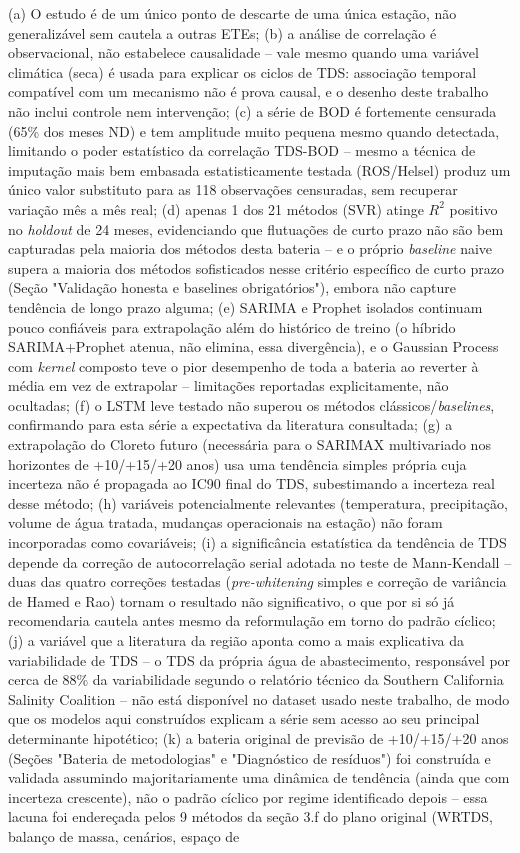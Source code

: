 (a) O estudo é de um único ponto de descarte de uma única estação, não generalizável sem cautela a outras ETEs; (b) a análise de correlação é observacional, não estabelece causalidade -- vale mesmo quando uma variável climática (seca) é usada para explicar os ciclos de TDS: associação temporal compatível com um mecanismo não é prova causal, e o desenho deste trabalho não inclui controle nem intervenção; (c) a série de BOD é fortemente censurada (65\% dos meses ND) e tem amplitude muito pequena mesmo quando detectada, limitando o poder estatístico da correlação TDS-BOD -- mesmo a técnica de imputação mais bem embasada estatisticamente testada (ROS/Helsel) produz um único valor substituto para as 118 observações censuradas, sem recuperar variação mês a mês real; (d) apenas 1 dos 21 métodos (SVR) atinge $R^2$ positivo no \textit{holdout} de 24 meses, evidenciando que flutuações de curto prazo não são bem capturadas pela maioria dos métodos desta bateria -- e o próprio \textit{baseline} naive supera a maioria dos métodos sofisticados nesse critério específico de curto prazo (Seção "Validação honesta e baselines obrigatórios"), embora não capture tendência de longo prazo alguma; (e) SARIMA e Prophet isolados continuam pouco confiáveis para extrapolação além do histórico de treino (o híbrido SARIMA+Prophet atenua, não elimina, essa divergência), e o Gaussian Process com \textit{kernel} composto teve o pior desempenho de toda a bateria ao reverter à média em vez de extrapolar -- limitações reportadas explicitamente, não ocultadas; (f) o LSTM leve testado não superou os métodos clássicos/\textit{baselines}, confirmando para esta série a expectativa da literatura consultada; (g) a extrapolação do Cloreto futuro (necessária para o SARIMAX multivariado nos horizontes de +10/+15/+20 anos) usa uma tendência simples própria cuja incerteza não é propagada ao IC90 final do TDS, subestimando a incerteza real desse método; (h) variáveis potencialmente relevantes (temperatura, precipitação, volume de água tratada, mudanças operacionais na estação) não foram incorporadas como covariáveis; (i) a significância estatística da tendência de TDS depende da correção de autocorrelação serial adotada no teste de Mann-Kendall -- duas das quatro correções testadas (\textit{pre-whitening} simples e correção de variância de Hamed e Rao) tornam o resultado não significativo, o que por si só já recomendaria cautela antes mesmo da reformulação em torno do padrão cíclico; (j) a variável que a literatura da região aponta como a mais explicativa da variabilidade de TDS -- o TDS da própria água de abastecimento, responsável por cerca de 88\% da variabilidade segundo o relatório técnico da Southern California Salinity Coalition \cite{scsc2018tds} -- não está disponível no dataset usado neste trabalho, de modo que os modelos aqui construídos explicam a série sem acesso ao seu principal determinante hipotético; (k) a bateria original de previsão de +10/+15/+20 anos (Seções "Bateria de metodologias" e "Diagnóstico de resíduos") foi construída e validada assumindo majoritariamente uma dinâmica de tendência (ainda que com incerteza crescente), não o padrão cíclico por regime identificado depois -- essa lacuna foi endereçada pelos 9 métodos da seção 3.f do plano original (WRTDS, balanço de massa, cenários, espaço de 